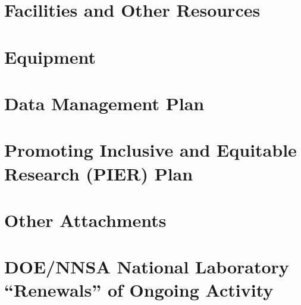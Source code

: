 \documentclass[11pt]{article}
\begin{document}
\thispagestyle{empty}
\AddToShipoutPicture*{\BackgroundPic}


\clearpage
\ifdefined\tocflag
\thispagestyle{empty}
\tableofcontents
\clearpage
\fi
{}

\thispagestyle{fancy}
\setlength{\headheight}{19.7478pt}
\setlength{\headsep}{4pt}
\newlength{\nsfoffset}
\setlength{\nsfoffset}{\headheight}
\addtolength{\nsfoffset}{\baselineskip}



\appendix


\clearpage

\section{Facilities and Other Resources}\label{sec:facilities}


\section{Equipment}\label{sec:equipment}


\clearpage
\section{Data Management Plan}\label{sec:dataplan}

\clearpage

\clearpage
\section{Promoting Inclusive and Equitable Research (PIER) Plan}\label{sec:pierplan}

\clearpage

\section{Other Attachments}\label{sec:other}


\section{DOE/NNSA National Laboratory \texorpdfstring{``Renewals''}{"Renewals"} of Ongoing Activity}\label{sec:labrenewal}

\end{document}
